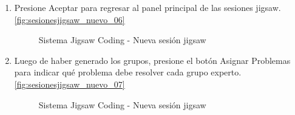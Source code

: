 \begin{enumerate}
\begin{figure}
	\end{figure}
	\item Presione Aceptar para regresar al panel principal de las sesiones jigsaw. \autoref{fig:sesionesjigsaw_nuevo_06}
	\begin{figure}
		\centering
		\caption{Sistema Jigsaw Coding - Nueva sesión jigsaw}
		\label{fig:sesionesjigsaw_nuevo_06}
	\end{figure}
	\item Luego de haber generado los grupos, presione el botón Asignar Problemas para indicar qué problema debe resolver cada grupo experto. \autoref{fig:sesionesjigsaw_nuevo_07}
	\begin{figure}
		\centering
		\caption{Sistema Jigsaw Coding - Nueva sesión jigsaw}
		\label{fig:sesionesjigsaw_nuevo_07}

\end{figure}
\end{enumerate}
